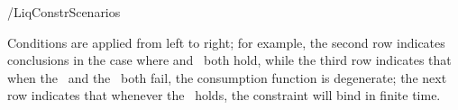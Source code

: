 \documentclass[../BufferStockTheory]{subfiles}
\let\TableWidth\relax %
\newlength\TableWidth
\begin{document}
\begin{verbatimwrite}{\TableDir/LiqConstrScenarios}
\begin{table}[b]
\settowidth\TableWidth{\usebox{\LiqConstrScenarios}}
\usebox{\LiqConstrScenarios}

\parbox{\TableWidth}{\footnotesize Conditions are applied from left to right; for example, the second row indicates conclusions in the case where \cncl{\PFGIC} and \RIC~both hold, while the third row indicates that when the \PFGIC~and the \RIC~both fail, the consumption function is degenerate; the next row indicates that whenever the \PFGIC~holds, the constraint will bind in finite time.}

\end{table}

\end{verbatimwrite}
\clearpage

\end{document}
